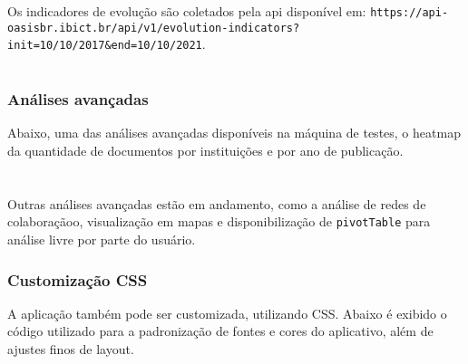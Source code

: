 \documentclass[
]{article}
\begin{document}
Os indicadores de evolução são coletados pela api disponível em:
\texttt{https://api-oasisbr.ibict.br/api/v1/evolution-indicators?init=10/10/2017\&end=10/10/2021}.

\hypertarget{section-2}{%
\section{}\label{section-2}}

\hypertarget{anuxe1lises-avanuxe7adas}{%
\subsubsection{Análises avançadas}\label{anuxe1lises-avanuxe7adas}}

Abaixo, uma das análises avançadas disponíveis na máquina de testes, o
heatmap da quantidade de documentos por instituições e por ano de
publicação.

\hypertarget{section-3}{%
\section{}\label{section-3}}

Outras análises avançadas estão em andamento, como a análise de redes de
colaboraçãoo, visualização em mapas e disponibilização de
\texttt{pivotTable} para análise livre por parte do usuário.

\hypertarget{customizauxe7uxe3o-css}{%
\subsubsection{Customização CSS}\label{customizauxe7uxe3o-css}}

A aplicação também pode ser customizada, utilizando CSS. Abaixo é
exibido o código utilizado para a padronização de fontes e cores do
aplicativo, além de ajustes finos de layout.
\end{document}
